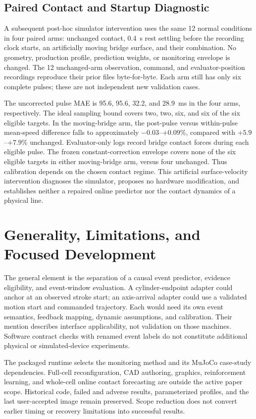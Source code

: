 \subsection{Paired Contact and Startup Diagnostic}
A subsequent post-hoc simulator intervention uses the same 12 normal conditions in four paired arms: unchanged contact, 0.4~s rest settling before the recording clock starts, an artificially moving bridge surface, and their combination. No geometry, production profile, prediction weights, or monitoring envelope is changed. The 12 unchanged-arm observation, command, and evaluator-position recordings reproduce their prior files byte-for-byte. Each arm still has only six complete pulses; these are not independent new validation cases.

The uncorrected pulse MAE is 95.6, 95.6, 32.2, and 28.9~ms in the four arms, respectively. The ideal sampling bound covers two, two, six, and six of the six eligible targets. In the moving-bridge arm, the post-pulse versus within-pulse mean-speed difference falls to approximately $-0.03$--$+0.09$\%, compared with $+5.9$--$+7.9$\% unchanged. Evaluator-only logs record bridge contact forces during each eligible pulse. The frozen constant-correction envelope covers none of the six eligible targets in either moving-bridge arm, versus four unchanged. Thus calibration depends on the chosen contact regime. This artificial surface-velocity intervention diagnoses the simulator, proposes no hardware modification, and establishes neither a repaired online predictor nor the contact dynamics of a physical line.

\section{Generality, Limitations, and Focused Development}
The general element is the separation of a causal event predictor, evidence eligibility, and event-window evaluation. A cylinder-endpoint adapter could anchor at an observed stroke start; an axis-arrival adapter could use a validated motion start and commanded trajectory. Each would need its own event semantics, feedback mapping, dynamic assumptions, and calibration. Their mention describes interface applicability, not validation on those machines. Software contract checks with renamed event labels do not constitute additional physical or simulated-device experiments.

The packaged runtime selects the monitoring method and its MuJoCo case-study dependencies. Full-cell reconfiguration, CAD authoring, graphics, reinforcement learning, and whole-cell online contact forecasting are outside the active paper scope. Historical code, failed and adverse results, parameterized profiles, and the last user-accepted image remain preserved. Scope reduction does not convert earlier timing or recovery limitations into successful results.

